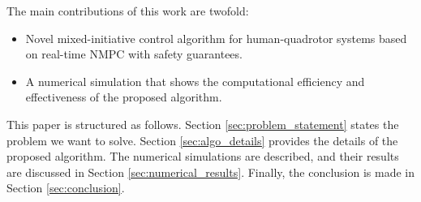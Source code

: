 The main contributions of this work are twofold:
\begin{itemize}
	\item Novel mixed-initiative control algorithm for human-quadrotor systems based on real-time NMPC with safety guarantees.
	\item A numerical simulation that shows the computational efficiency and effectiveness of the proposed algorithm.
\end{itemize}

This paper is structured as follows. Section \ref{sec:problem_statement} states the problem we want to solve. Section \ref{sec:algo_details} provides the details of the proposed algorithm. The numerical simulations are described, and their results are discussed in Section \ref{sec:numerical_results}. Finally, the conclusion is made in Section \ref{sec:conclusion}.
